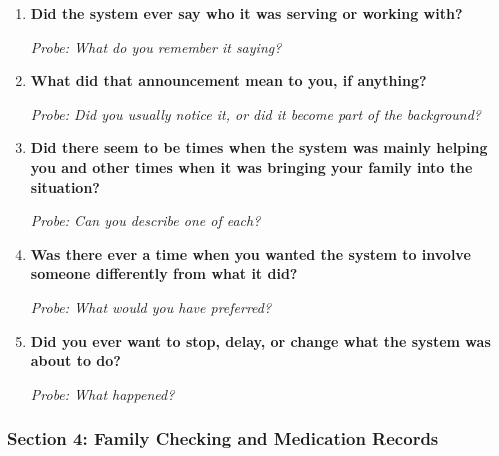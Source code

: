 \begin{enumerate}[resume]
  \item \textbf{Did the system ever say who it was serving or working with?}

  \textit{Probe: What do you remember it saying?}
  \item \textbf{What did that announcement mean to you, if anything?}

  \textit{Probe: Did you usually notice it, or did it become part of the background?}
  \item \textbf{Did there seem to be times when the system was mainly helping you and other times when it was bringing your family into the situation?}

  \textit{Probe: Can you describe one of each?}
  \item \textbf{Was there ever a time when you wanted the system to involve someone differently from what it did?}

  \textit{Probe: What would you have preferred?}
  \item \textbf{Did you ever want to stop, delay, or change what the system was about to do?}

  \textit{Probe: What happened?}
\end{enumerate}

\subsubsection{Section 4: Family Checking and Medication Records}

